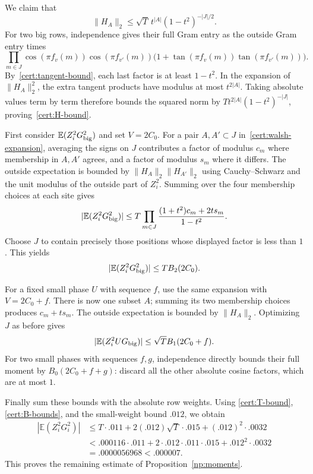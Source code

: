 We claim that
\begin{equation}\label{cert:H-bound}
 \|H_A\|_2\le\sqrt T\,t^{|A|}(1-t^2)^{-|J|/2}.
\end{equation}
For two big rows, independence gives their full Gram entry as the
outside Gram entry times
\[
 \prod_{m\in J}\cos(\pi f_v(m))\cos(\pi f_{v'}(m))
       \bigl(1+\tan(\pi f_v(m))\tan(\pi f_{v'}(m))\bigr).
\]
By~\eqref{cert:tangent-bound}, each last factor is at least $1-t^2$.
In the expansion of $\|H_A\|_2^2$, the extra tangent products have
modulus at most $t^{2|A|}$.  Taking absolute values term by term
therefore bounds the squared norm by
$Tt^{2|A|}(1-t^2)^{-|J|}$, proving~\eqref{cert:H-bound}.

First consider $\mathbb E(Z_i^2G_{\rm big}^2)$ and set $V=2C_0$.
For a pair $A,A'\subset J$ in~\eqref{cert:walsh-expansion},
averaging the signs on $J$ contributes a factor of modulus $c_m$
where membership in $A,A'$ agrees, and a factor of modulus $s_m$
where it differs.  The outside expectation is bounded by
$\|H_A\|_2\|H_{A'}\|_2$ using Cauchy--Schwarz and the unit modulus
of the outside part of $Z_i^2$.  Summing over the four membership
choices at each site gives
\[
 |\mathbb E(Z_i^2G_{\rm big}^2)|
 \le T\prod_{m\in J}\frac{(1+t^2)c_m+2ts_m}{1-t^2}.
\]
Choose $J$ to contain precisely those positions whose displayed
factor is less than $1$.  This yields
\begin{equation}\label{cert:big-square}
 |\mathbb E(Z_i^2G_{\rm big}^2)|\le T B_2(2C_0).
\end{equation}

For a fixed small phase $U$ with sequence $f$, use the same expansion
with $V=2C_0+f$.  There is now one subset $A$; summing its two
membership choices produces $c_m+ts_m$.  The outside expectation
is bounded by $\|H_A\|_2$.  Optimizing $J$ as before gives
\[
 |\mathbb E(Z_i^2UG_{\rm big})|
 \le\sqrt T B_1(2C_0+f).
\]
For two small phases with sequences $f,g$, independence directly
bounds their full moment by $B_0(2C_0+f+g)$: discard all the other
absolute cosine factors, which are at most $1$.

Finally sum these bounds with the absolute row weights.  Using
\eqref{cert:T-bound}, \eqref{cert:B-bounds}, and the small-weight
bound $.012$, we obtain
\[
 \begin{split}
 |\mathbb E(Z_i^2G_i^2)|
 &\le T\cdot.011+2(.012)\sqrt T\cdot.015
                           +(.012)^2\cdot.0032\\
 &<.000116\cdot.011+2\cdot.012\cdot.011\cdot.015
                           +.012^2\cdot.0032\\
 &=.0000056968<.000007.
 \end{split}
\]
This proves the remaining estimate of Proposition~\ref{np:moments}.
